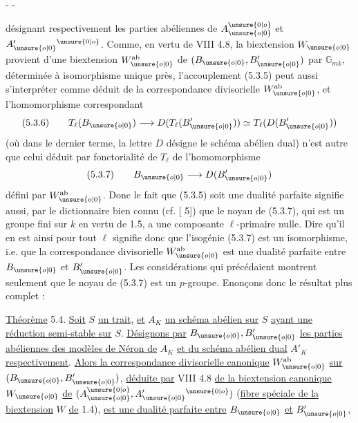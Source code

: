 \begin{center}-  -\end{center}

désignant respectivement les parties abéliennes de $A_{\unsure{o|0}}^{\unsure{0|o}}$ et $A'_{\unsure{o|0}}{}^{\unsure{0|o}}$. Comme, en vertu de VIII 4.8, la biextension $W_{\unsure{o|0}}$ provient d'une biextension $W_{\unsure{o|0}}^{\mathrm{ab}}$ de $(B_{\unsure{o|0}},B'_{\unsure{o|0}})$ par $\mathbb G_{mk}$, déterminée à isomorphisme unique près, l'accouplement (5.3.5) peut aussi s'interpréter comme déduit de la correspondance divisorielle $W_{\unsure{o|0}}^{\mathrm{ab}}$, et l'homomorphisme correspondant
\[
(5.3.6)\qquad T_\ell(B_{\unsure{o|0}})\longrightarrow D(T_\ell(B'_{\unsure{o|0}}))\simeq T_\ell(D(B'_{\unsure{o|0}}))
\]
(où dans le dernier terme, la lettre $D$ désigne le schéma abélien dual) n'est autre que celui déduit par fonctorialité de $T_\ell$ de l'homomorphisme
\[
(5.3.7)\qquad B_{\unsure{o|0}}\longrightarrow D(B'_{\unsure{o|0}})
\]
défini par $W_{\unsure{o|0}}^{\mathrm{ab}}$. Donc le fait que (5.3.5) soit une dualité parfaite signifie aussi, par le dictionnaire bien connu (cf. [ 5]) que le noyau de (5.3.7), qui est un groupe fini sur $k$ en vertu de 1.5, a une composante $\ell$-primaire nulle. Dire qu'il en est ainsi pour tout $\ell$ signifie donc que l'isogénie (5.3.7) est un isomorphisme, i.e. que la correspondance divisorielle $W_{\unsure{o|0}}^{\mathrm{ab}}$ est une dualité parfaite entre $B_{\unsure{o|0}}$ et $B'_{\unsure{o|0}}$. Les considérations qui précédaient montrent seulement que le noyau de (5.3.7) est un $p$-groupe. Enonçons donc le résultat plus complet :

\uline{Théorème} 5.4. \uline{Soit} $S$ \uline{un trait}, \uline{et} $A_K$ \uline{un schéma abélien sur} $S$ \uline{ayant une réduction semi-stable sur} $S$. \uline{Désignons par} $B_{\unsure{o|0}},B'_{\unsure{o|0}}$ \uline{les parties abéliennes des modèles de Néron de} $A_K$ \uline{et du schéma abélien dual} $A'_K$ \uline{respectivement}. \uline{Alors la correspondance divisorielle canonique} $W_{\unsure{o|0}}^{\mathrm{ab}}$ \uline{sur} $(B_{\unsure{o|0}},B'_{\unsure{o|0}})$, \uline{déduite par} VIII 4.8 \uline{de la biextension canonique} $W_{\unsure{o|0}}$ \uline{de} $(A_{\unsure{o|0}}^{\unsure{0|o}},A'_{\unsure{o|0}}{}^{\unsure{0|o}})$ (\uline{fibre spéciale de la biextension} $W$ \uline{de} 1.4), \uline{est une dualité parfaite entre} $B_{\unsure{o|0}}$ \uline{et} $B'_{\unsure{o|0}}$,

